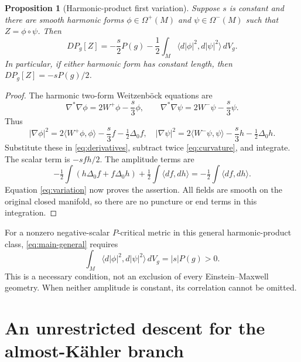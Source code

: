 \documentclass[11pt,a4paper]{article}
\newtheorem{proposition}[theorem]{Proposition}
\theoremstyle{remark}\newtheorem{remark}[theorem]{Remark}
\newcommand{\ip}[2]{\langle #1,#2\rangle}
\numberwithin{equation}{section}
\begin{document}
\begin{proposition}[Harmonic-product first variation]\label{prop:product}
Suppose $s$ is constant and there are smooth harmonic forms
$\phi\in\Omega^+(M)$ and $\psi\in\Omega^-(M)$ such that
$Z=\phi\circ\psi$. Then
\begin{equation}\label{eq:main-general}
 \boxed{DP_g[Z]=-\frac{s}{2}P(g)
           -\frac12\int_M\ip{d|\phi|^2}{d|\psi|^2}\,dV_g.}
\end{equation}
In particular, if either harmonic form has constant length, then
$DP_g[Z]=-sP(g)/2$.
\end{proposition}
\begin{proof}
The harmonic two-form Weitzenb\"ock equations are
\[
 \nabla^*\nabla\phi=2W^+\phi-\frac{s}{3}\phi,
 \qquad
 \nabla^*\nabla\psi=2W^-\psi-\frac{s}{3}\psi.
\]
Thus
\[
 |\nabla\phi|^2=2\ip{W^+\phi}{\phi}-\frac{s}{3}f-\tfrac12\Delta_0f,
 \quad
 |\nabla\psi|^2=2\ip{W^-\psi}{\psi}-\frac{s}{3}h-\tfrac12\Delta_0h.
\]
Substitute these in \eqref{eq:derivatives}, subtract twice
\eqref{eq:curvature}, and integrate. The scalar term is $-sfh/2$.
The amplitude terms are
\[
 -\tfrac12\int(h\Delta_0f+f\Delta_0h)
       +\tfrac12\int\ip{df}{dh}
 =-\tfrac12\int\ip{df}{dh}.
\]
Equation \eqref{eq:variation} now proves the assertion.
All fields are smooth on the original closed manifold, so there are
no puncture or end terms in this integration.
\end{proof}

For a nonzero negative-scalar $P$-critical metric in this general
harmonic-product class, \eqref{eq:main-general} requires
\begin{equation}\label{eq:amplitude}
 \int_M\ip{d|\phi|^2}{d|\psi|^2}\,dV_g=|s|P(g)>0.
\end{equation}
This is a necessary condition, not an exclusion of every
Einstein--Maxwell geometry. When neither amplitude is constant, its
correlation cannot be omitted.

\section{An unrestricted descent for the almost-K\"ahler branch}
\end{document}
